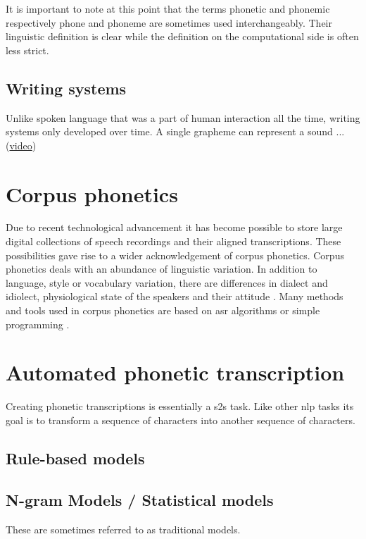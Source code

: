 It is important to note at this point that the terms phonetic and phonemic respectively phone and phoneme are sometimes used interchangeably. Their linguistic definition is clear while the definition on the computational side is often less strict. 

\subsection*{Writing systems}
Unlike spoken language that was a part of human interaction all the time, writing systems only developed over time. A single grapheme can represent a sound ... (\href{https://www.youtube.com/watch?v=-sUUWyo4RZQ&list=PL8dPuuaLjXtP5mp25nStsuDzk2blncJDW&index=17}{video})



\section{Corpus phonetics}
Due to recent technological advancement it has become possible to store large digital collections of speech recordings and their aligned transcriptions. These possibilities gave rise to a wider acknowledgement of corpus phonetics. Corpus phonetics deals with an abundance of linguistic variation. In addition to language, style or vocabulary variation, there are differences in dialect and idiolect, physiological state of the speakers and their attitude \citep{Liberman.2019, Chodroff.19.07.2019}. Many methods and tools used in corpus phonetics are based on \ac{asr} algorithms or simple programming \citep{Chodroff.19.07.2019}.

\section{Automated phonetic transcription}
Creating phonetic transcriptions is essentially a \ac{s2s} task. Like other \ac{nlp} tasks its goal is to transform a sequence of characters into another sequence of characters.  

\subsection{Rule-based models}


\subsection{N-gram Models / Statistical models}
These are sometimes referred to as traditional models. 


